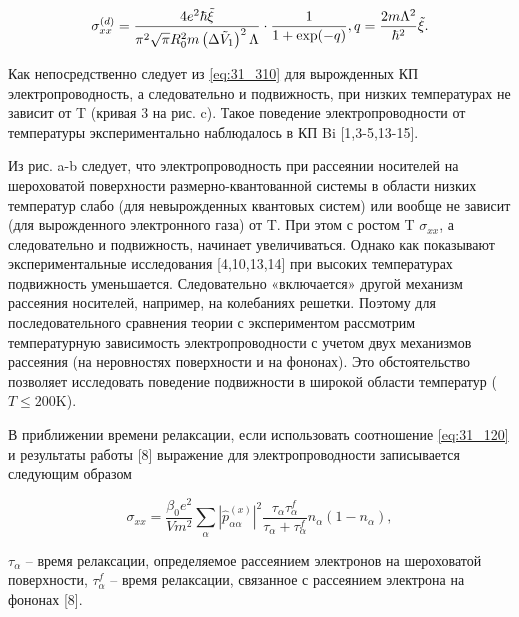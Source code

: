 \begin{equation} \label{eq:31_310}
\sigma _{xx}^{(d)} =\frac{4e^{2} \hbar \tilde{\xi }}{\pi ^{2} \sqrt{\pi } R_{0}^{2} m\left(\Delta \tilde{V}_{1} \right)^{2} \Lambda } \cdot \frac{{\rm 1}}{1+{\exp}(-q)} , q=\frac{2m\Lambda ^{2} }{\hbar ^{2} } \tilde{\xi }.  
\end{equation}

Как непосредственно следует из \eqref{eq:31_310} для вырожденных КП электропроводность, а следовательно и подвижность, при низких температурах не зависит от T (кривая 3 на рис. c). Такое поведение электропроводности от температуры экспериментально наблюдалось в КП Bi \cite{Lin2000,Heremans1998,Zhang2000,Heremans2000,Gitsu2003,Nikolaeva2006,Gitsu2005}[1,3-5,13-15].

Из рис. a-b следует, что электропроводность при рассеянии носителей на шероховатой поверхности размерно-квантованной системы в области низких температур слабо (для невырожденных квантовых систем) или вообще не зависит (для вырожденного электронного газа) от T. При этом с ростом T $\sigma _{xx} $, а следовательно и подвижность, начинает увеличиваться. Однако как показывают экспериментальные исследования \cite{Zhang2000,Gitsu2003,Nikolaeva2006}[4,10,13,14] при высоких температурах подвижность уменьшается. Следовательно «включается» другой механизм рассеяния носителей, например, на колебаниях решетки. Поэтому для последовательного сравнения теории с экспериментом рассмотрим температурную зависимость электропроводности с учетом двух механизмов рассеяния (на неровностях поверхности и на фононах). Это обстоятельство позволяет исследовать поведение подвижности в широкой области температур ($T\le 200\text{K}$).

В приближении времени релаксации, если использовать соотношение \eqref{eq:31_120} и результаты работы \cite{Khamidullin2002}[8] выражение для электропроводности записывается следующим образом

\begin{equation} \label{eq:31_320}
\sigma _{xx} =\frac{\beta _{0} e^{2} }{Vm^{2} } \sum _{\alpha }\left|\hat{p}_{\alpha \alpha _{} }^{(x)} \right|^{2} \frac{\tau _{\alpha } \tau _{\alpha }^{f} }{\tau _{\alpha } +\tau _{\alpha }^{f} } n_{\alpha } \left(1-n_{\alpha } \right),
\end{equation}

\noindent $\tau _{\alpha } $ -- время релаксации, определяемое рассеянием электронов на шероховатой поверхности, $\tau _{\alpha }^{f} $ -- время релаксации, связанное с рассеянием электрона на фононах \cite{Khamidullin2002}[8].

